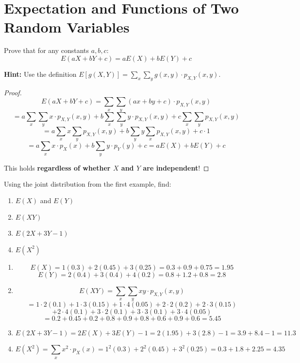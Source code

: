 \section{Expectation and Functions of Two Random Variables}

\begin{exercise}
Prove that for any constants $a, b, c$:
\[
E(aX + bY + c) = aE(X) + bE(Y) + c
\]

\textbf{Hint:} Use the definition $E[g(X, Y)] = \sum_{x} \sum_{y} g(x, y) \cdot p_{X,Y}(x, y)$.
\end{exercise}

\begin{proof}
\[
E(aX + bY + c) = \sum_{x} \sum_{y} (ax + by + c) \cdot p_{X,Y}(x, y)
\]
\[
= a \sum_{x} \sum_{y} x \cdot p_{X,Y}(x, y) + b \sum_{x} \sum_{y} y \cdot p_{X,Y}(x, y) + c \sum_{x} \sum_{y} p_{X,Y}(x, y)
\]
\[
= a \sum_{x} x \sum_{y} p_{X,Y}(x, y) + b \sum_{y} y \sum_{x} p_{X,Y}(x, y) + c \cdot 1
\]
\[
= a \sum_{x} x \cdot p_X(x) + b \sum_{y} y \cdot p_Y(y) + c = aE(X) + bE(Y) + c
\]

This holds \textbf{regardless of whether $X$ and $Y$ are independent}!
\end{proof}

\begin{eg}
Using the joint distribution from the first example, find:
\begin{enumerate}[label=(\alph*)]
    \item $E(X)$ and $E(Y)$
    \item $E(XY)$
    \item $E(2X + 3Y - 1)$
    \item $E(X^2)$
\end{enumerate}

\begin{solution}
\begin{enumerate}[label=(\alph*)]
    \item 
    \[
    E(X) = 1(0.3) + 2(0.45) + 3(0.25) = 0.3 + 0.9 + 0.75 = 1.95
    \]
    \[
    E(Y) = 2(0.4) + 3(0.4) + 4(0.2) = 0.8 + 1.2 + 0.8 = 2.8
    \]
    
    \item 
    \[
    E(XY) = \sum_{x} \sum_{y} xy \cdot p_{X,Y}(x, y)
    \]
    \[
    = 1 \cdot 2(0.1) + 1 \cdot 3(0.15) + 1 \cdot 4(0.05) + 2 \cdot 2(0.2) + 2 \cdot 3(0.15)
    \]
    \[
    + 2 \cdot 4(0.1) + 3 \cdot 2(0.1) + 3 \cdot 3(0.1) + 3 \cdot 4(0.05)
    \]
    \[
    = 0.2 + 0.45 + 0.2 + 0.8 + 0.9 + 0.8 + 0.6 + 0.9 + 0.6 = 5.45
    \]
    
    \item 
    \[
    E(2X + 3Y - 1) = 2E(X) + 3E(Y) - 1 = 2(1.95) + 3(2.8) - 1 = 3.9 + 8.4 - 1 = 11.3
    \]
    
    \item 
    \[
    E(X^2) = \sum_{x} x^2 \cdot p_X(x) = 1^2(0.3) + 2^2(0.45) + 3^2(0.25) = 0.3 + 1.8 + 2.25 = 4.35
    \]
\end{enumerate}
\end{solution}
\end{eg}

